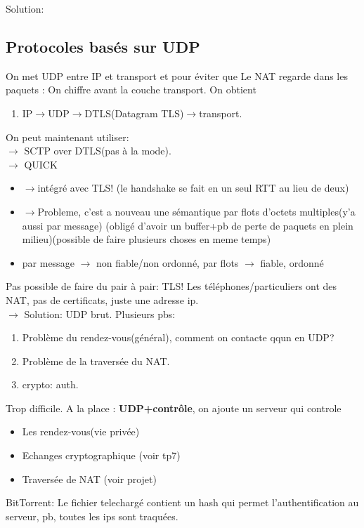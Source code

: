 \documentclass[12pt]{article}
\theoremstyle{plain}
\theoremstyle{definition}
\theoremstyle{remark}
\begin{document}
\newpage
Solution:
\subsection{Protocoles basés sur UDP}
On met UDP entre IP et transport et pour éviter que Le
NAT regarde dans les paquets : On chiffre avant la couche transport. On obtient
\begin{enumerate}
    \item IP$\rightarrow$UDP$\rightarrow$DTLS(Datagram TLS)$\rightarrow$transport.
\end{enumerate}

\noindent On peut maintenant utiliser:\\
\indent $\rightarrow$ SCTP over DTLS(pas à la mode).\\
\indent $\rightarrow$ QUICK\begin{itemize}
            \item $\rightarrow$intégré avec TLS! (le handshake se fait en un seul RTT au lieu de deux)
            \item $\rightarrow$Probleme, c'est a nouveau une sémantique par flots d'octets multiples(y'a aussi par message)
            (obligé d'avoir un buffer+pb de perte de paquets en plein milieu)(possible de faire plusieurs choses en meme temps)
            \item par message $\rightarrow$ non fiable/non ordonné, par flots $\rightarrow$ fiable, ordonné
\end{itemize}

Pas possible de faire du pair à pair: TLS! Les téléphones/particuliers ont des NAT, pas de certificats, juste une adresse ip.\\
\indent $\rightarrow$ Solution: UDP brut.
Plusieurs pbs: \begin{enumerate}
    \item Problème du rendez-vous(général), comment on contacte qqun en UDP?
    \item Problème de la traversée du NAT.
    \item crypto: auth.
\end{enumerate}
Trop difficile. A la place : \textbf{UDP+contrôle}, on ajoute un serveur qui controle
\begin{itemize}
    \item Les rendez-vous(vie privée)
    \item Echanges cryptographique (voir tp7)
    \item Traversée de NAT (voir projet)
\end{itemize}

BitTorrent: Le fichier telechargé contient un hash qui permet l'authentification au serveur, pb, toutes les ips sont traquées.
\end{document}
